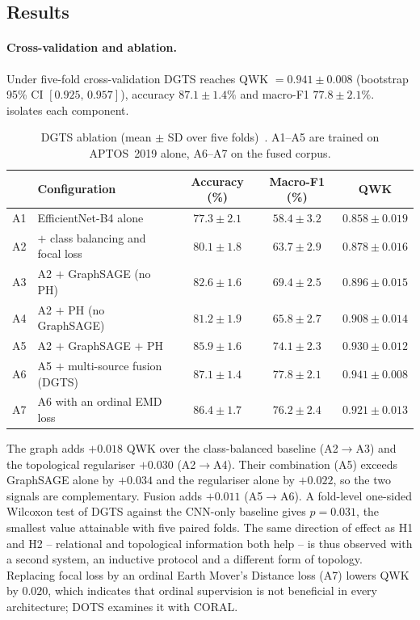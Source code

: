 \subsection{Results}

\paragraph{Cross-validation and ablation.}
Under five-fold cross-validation DGTS reaches QWK $=0.941\pm0.008$ (bootstrap 95\% CI
$[0.925,\,0.957]$), accuracy $87.1\pm1.4\%$ and macro-F1 $77.8\pm2.1\%$.
 isolates each component.

\begin{table}[!htbp]
\centering
\caption[DGTS ablation]{DGTS ablation (mean $\pm$ SD over five folds)~\cite{belhadj2026dgts}.
A1--A5 are trained on APTOS~2019 alone, A6--A7 on the fused corpus.}
\label{tab:dgts-abl}
\small
\begin{tabular}{@{}llccc@{}}
\toprule
& Configuration & Accuracy (\%) & Macro-F1 (\%) & QWK \\
\midrule
A1 & EfficientNet-B4 alone & $77.3\pm2.1$ & $58.4\pm3.2$ & $0.858\pm0.019$ \\
A2 & $+$ class balancing and focal loss & $80.1\pm1.8$ & $63.7\pm2.9$ & $0.878\pm0.016$ \\
A3 & A2 $+$ GraphSAGE (no PH) & $82.6\pm1.6$ & $69.4\pm2.5$ & $0.896\pm0.015$ \\
A4 & A2 $+$ PH (no GraphSAGE) & $81.2\pm1.9$ & $65.8\pm2.7$ & $0.908\pm0.014$ \\
A5 & A2 $+$ GraphSAGE $+$ PH & $85.9\pm1.6$ & $74.1\pm2.3$ & $0.930\pm0.012$ \\
A6 & A5 $+$ multi-source fusion (DGTS) & $\mathbf{87.1\pm1.4}$ & $\mathbf{77.8\pm2.1}$ & $\mathbf{0.941\pm0.008}$ \\
A7 & A6 with an ordinal EMD loss & $86.4\pm1.7$ & $76.2\pm2.4$ & $0.921\pm0.013$ \\
\bottomrule
\end{tabular}
\end{table}

The graph adds $+0.018$ QWK over the class-balanced baseline (A2$\to$A3) and the
topological regulariser $+0.030$ (A2$\to$A4). Their combination (A5) exceeds GraphSAGE
alone by $+0.034$ and the regulariser alone by $+0.022$, so the two signals are
complementary. Fusion adds $+0.011$ (A5$\to$A6). A fold-level one-sided Wilcoxon test of
DGTS against the CNN-only baseline gives $p=0.031$, the smallest value attainable with five
paired folds. The same direction of effect as H1 and H2 -- relational and topological
information both help -- is thus observed with a second system, an inductive protocol and a different form of
topology. Replacing focal loss by an ordinal Earth Mover's Distance loss (A7) lowers QWK by
$0.020$, which indicates that ordinal supervision is not beneficial in every architecture;
DOTS examines it with CORAL.

